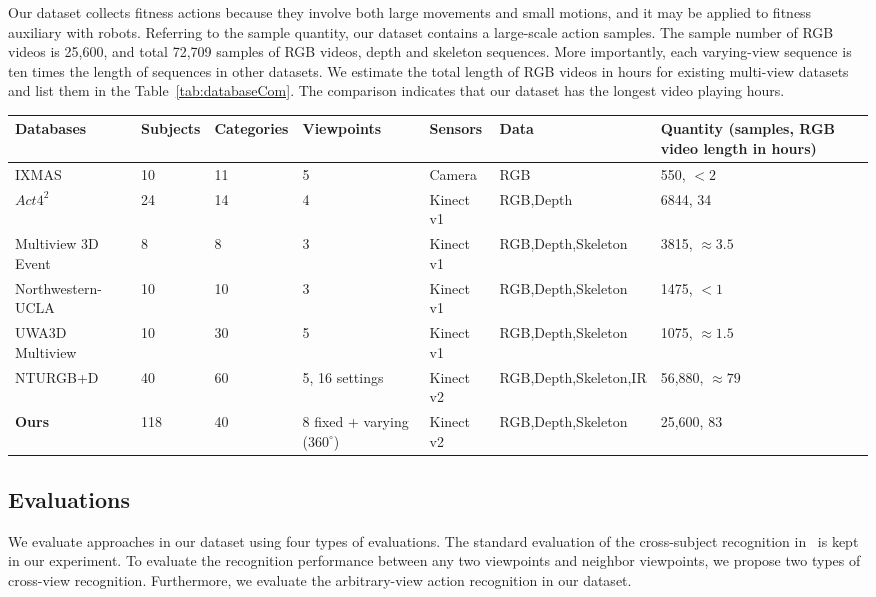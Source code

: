 \documentclass[journal]{IEEEtran}
\begin{document}
Our dataset collects fitness actions because they involve both large movements and small motions, and it may be applied to fitness auxiliary with robots.
Referring to the sample quantity, our dataset contains a large-scale action samples. The sample number of RGB videos is 25,600, and total 72,709 samples of RGB videos, depth and skeleton sequences. More importantly, each varying-view sequence is ten times the length of sequences in other datasets. We estimate the total length of RGB videos in hours for existing multi-view datasets and list them in the Table~\ref{tab:databaseCom}. The comparison indicates that our dataset has the longest video playing hours.

\begin{table*}[!t] \footnotesize
\begin{center}
\caption{Comparison with other multi-view action datasets.}
\label{tab:databaseCom}
\begin{tabular}{|p{3cm}|p{1cm}|p{1.2cm}|p{2cm}|p{2cm}|p{2.8cm}|p{3cm}|}
\hline
Databases & Subjects & Categories & Viewpoints & Sensors & Data & Quantity (samples, RGB video length in hours)\\
\hline
IXMAS~\cite{IXMAS2006} & 10  & 11 & 5 & Camera & RGB & 550, $ < 2 $\\
$Act4^2$ ~\cite{ChengACT42012} & 24 & 14 & 4 & Kinect v1 & RGB,Depth & 6844, 34 \\
Multiview 3D Event~\cite{Wei4DHOI2013} & 8 & 8 & 3 & Kinect v1 & RGB,Depth,Skeleton & 3815, $\approx 3.5$ \\
Northwestern-UCLA~\cite{WangMSTAOG2014} & 10 & 10 & 3 & Kinect v1 & RGB,Depth,Skeleton & 1475, $ < 1$ \\
UWA3D Multiview~\cite{RahmaniUWA3D2016} & 10 & 30 & 5 & Kinect v1 & RGB,Depth,Skeleton & 1075, $\approx 1.5$ \\
NTURGB+D~\cite{ShahroudyNTU2016} & 40 & 60 & 5, 16 settings & Kinect v2 & RGB,Depth,Skeleton,IR  & 56,880, $\approx 79$ \\
\textbf{Ours} & 118 & 40 & 8 fixed + varying ($360^\circ$) & Kinect v2 & RGB,Depth,Skeleton & 25,600, 83 \\
\hline
\end{tabular}
\end{center}
\end{table*}

\subsection{Evaluations}
We evaluate approaches in our dataset using four types of evaluations. The standard evaluation of the cross-subject recognition in~\cite{ShahroudyNTU2016} is kept in our experiment. To evaluate the recognition performance between any two viewpoints and neighbor viewpoints, we propose two types of cross-view recognition. Furthermore, we evaluate the arbitrary-view action recognition in our dataset.
\end{document}
